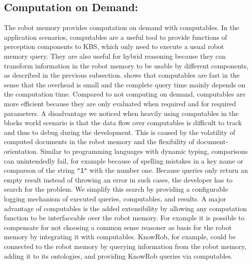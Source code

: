 \subsection{Computation on Demand:}
The robot memory provides computation on demand with computables. In
the application scenarios, computables are a useful tool to provide
functions of perception components to KBS, which only need to execute
a usual robot memory query. They are also useful for hybrid reasoning
because they can transform information in the robot memory to be
usable by different components, as described in the previous
subsection.  shows that
computables are fast in the sense that the overhead is small and the
complete query time mainly depends on the computation time. Compared
to not computing on demand, computables are more efficient because
they are only evaluated when required and for required parameters.
A disadvantage we noticed when heavily using computables in the blocks
world scenario is that the data flow over computables is difficult to
track and thus to debug during the development. This is caused by the
volatility of computed documents in the robot memory and the
flexibility of document-orientation. Similar to programming
languages with dynamic typing, comparisons can unintendedly fail, for
example because of spelling mistakes in a key name or comparson
of the string \texttt{"1"} with the number one. Because queries
only return an empty result instead of throwing an error in such
cases, the developer has to search for the problem. We
simplify this search by providing a configurable logging mechanism of
executed queries, computables, and results.
A major advantage of computables is the added extensibility by
allowing any computation function to be interfaceable over the robot
memory. For example it is possible to compensate for not choosing a
common sense reasoner as basis for the robot memory by integrating it
with computables. KnowRob, for example, could be connected to the
robot memory by querying information from the robot memory, adding it
to its ontologies, and providing KnowRob queries via computables.

